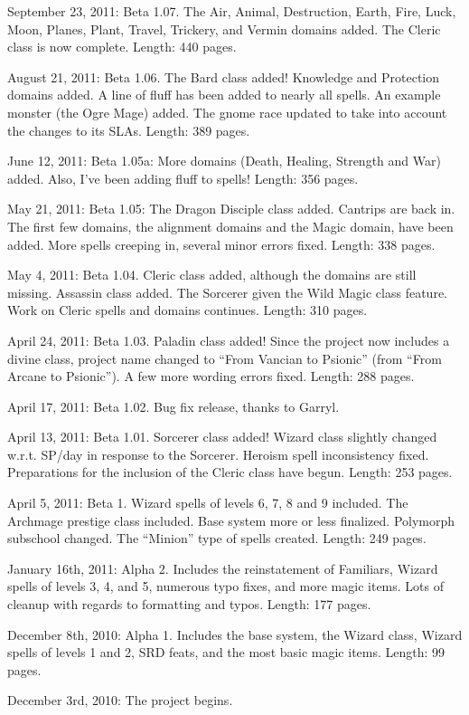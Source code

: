 \begin{list}{}{\leftmargin=1em}
 \item September 23, 2011: Beta 1.07. The Air, Animal, Destruction, Earth, Fire, Luck, Moon, Planes, Plant, Travel, Trickery, and Vermin domains added. The Cleric class is now complete. Length: 440 pages.
 \item August 21, 2011: Beta 1.06. The Bard class added! Knowledge and Protection domains added. A line of fluff has been added to nearly all spells. An example monster (the Ogre Mage) added. The gnome race updated to take into account the changes to its SLAs. Length: 389 pages.
 \item June 12, 2011: Beta 1.05a: More domains (Death, Healing, Strength and War) added.
 Also, I've been adding fluff to spells! Length: 356 pages.
 \item May 21, 2011: Beta 1.05: The Dragon Disciple class added. Cantrips are back in. The first few domains, the alignment domains and the Magic domain, have been added.
 More spells creeping in, several minor errors fixed. Length: 338 pages.
 \item May 4, 2011: Beta 1.04. Cleric class added, although the domains are still missing.
 Assassin class added. The Sorcerer given the Wild Magic class feature. Work on Cleric spells and domains continues.
 Length: 310 pages.
 \item April 24, 2011: Beta 1.03. Paladin class added! Since the project now includes a divine class, project name changed to ``From Vancian to Psionic''
 (from ``From Arcane to Psionic''). A few more wording errors fixed. Length: 288 pages.
 \item April 17, 2011: Beta 1.02. Bug fix release, thanks to Garryl.
 \item April 13, 2011: Beta 1.01. Sorcerer class added! Wizard class slightly changed w.r.t. SP/day in response to the Sorcerer. Heroism spell inconsistency fixed.
 Preparations for the inclusion of the Cleric class have begun.
 Length: 253 pages.
 \item April 5, 2011: Beta 1. Wizard spells of levels 6, 7, 8 and 9 included. The Archmage prestige class included.
 Base system more or less finalized. Polymorph subschool changed. The ``Minion'' type of spells created.
 Length: 249 pages.
 \item January 16th, 2011: Alpha 2. Includes the reinstatement of Familiars, Wizard spells of levels 3, 4, and 5, numerous typo fixes, and more magic items.
 Lots of cleanup with regards to formatting and typos. Length: 177 pages.
 \item December 8th, 2010: Alpha 1. Includes the base system, the Wizard class, Wizard spells of levels 1 and 2, SRD feats,
 and the most basic magic items. Length: 99 pages.
 \item December 3rd, 2010: The project begins.
\end{list}
